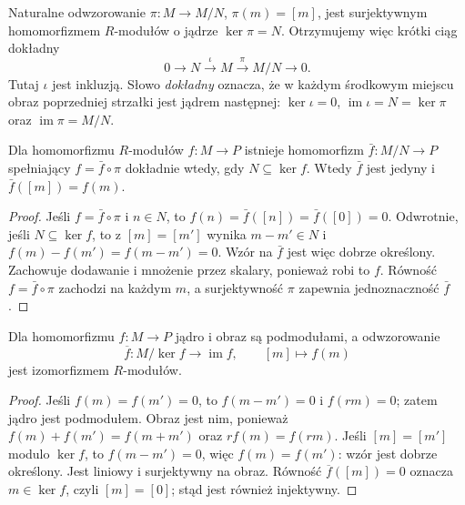Naturalne odwzorowanie $\pi\colon M\to M/N$, $\pi(m)=[m]$,
jest surjektywnym homomorfizmem $R$-modułów o jądrze
$\ker\pi=N$.
Otrzymujemy więc krótki ciąg dokładny
\[
0\longrightarrow N
\overset{\iota}{\longrightarrow} M
\overset{\pi}{\longrightarrow}M/N
\longrightarrow0.
\]
Tutaj $\iota$ jest inkluzją. Słowo \emph{dokładny} oznacza,
że w każdym środkowym miejscu obraz poprzedniej strzałki
jest jądrem następnej: $\ker\iota=0$,
$\operatorname{im}\iota=N=\ker\pi$ oraz
$\operatorname{im}\pi=M/N$.

\begin{stwierdzenie}
\label{prop:module-quotient-universal-5}
Dla homomorfizmu $R$-modułów $f:M\to P$ istnieje
homomorfizm $\bar f:M/N\to P$ spełniający
$f=\bar f\circ\pi$ dokładnie wtedy, gdy
$N\subseteq\ker f$. Wtedy $\bar f$ jest jedyny
i $\bar f([m])=f(m)$.
\end{stwierdzenie}
\begin{proof}
Jeśli $f=\bar f\circ\pi$ i $n\in N$, to
$f(n)=\bar f([n])=\bar f([0])=0$.
Odwrotnie, jeśli $N\subseteq\ker f$, to z
$[m]=[m']$ wynika $m-m'\in N$ i
$f(m)-f(m')=f(m-m')=0$. Wzór na $\bar f$
jest więc dobrze określony. Zachowuje dodawanie
i mnożenie przez skalary, ponieważ robi to $f$.
Równość $f=\bar f\circ\pi$ zachodzi na każdym $m$,
a surjektywność $\pi$ zapewnia jednoznaczność $\bar f$.
\end{proof}

\begin{twierdzenie}
\label{thm:modul-izomorfizm}
Dla homomorfizmu $f:M\to P$ jądro i obraz są podmodułami,
a odwzorowanie
\[
\overline f:M/\ker f\longrightarrow\operatorname{im}f,
\qquad [m]\longmapsto f(m)
\]
jest izomorfizmem $R$-modułów.
\end{twierdzenie}
\begin{proof}
Jeśli $f(m)=f(m')=0$, to $f(m-m')=0$ i $f(rm)=0$;
zatem jądro jest podmodułem. Obraz jest nim, ponieważ
$f(m)+f(m')=f(m+m')$ oraz $rf(m)=f(rm)$.
Jeśli $[m]=[m']$ modulo $\ker f$, to $f(m-m')=0$,
więc $f(m)=f(m')$: wzór jest dobrze określony.
Jest liniowy i surjektywny na obraz. Równość
$\overline f([m])=0$ oznacza $m\in\ker f$, czyli $[m]=[0]$;
stąd jest również injektywny.
\end{proof}

